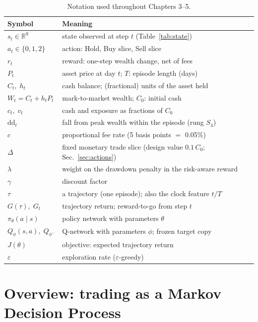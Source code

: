 \begin{table}[h]
\centering
\caption{Notation used throughout Chapters 3--5.}
\label{tab:notation}
\small
\begin{tabular}{ll}
\toprule
\textbf{Symbol} & \textbf{Meaning} \\
\midrule
$s_t \in \mathbb{R}^9$ & state observed at step $t$ (Table~\ref{tab:state}) \\
$a_t \in \{0,1,2\}$    & action: Hold, Buy slice, Sell slice \\
$r_t$                  & reward: one-step wealth change, net of fees \\
$P_t$                  & asset price at day $t$; \; $T$: episode length (days) \\
$C_t,\; h_t$           & cash balance; (fractional) units of the asset held \\
$W_t = C_t + h_t P_t$  & mark-to-market wealth; \; $C_0$: initial cash \\
$c_t,\; v_t$           & cash and exposure as fractions of $C_0$ \\
$\mathrm{dd}_t$        & fall from peak wealth within the episode (rung $S_4$) \\
$c$                    & proportional fee rate (5 basis points $=$ 0.05\%) \\
$\Delta$                & fixed monetary trade slice (design value $0.1\,C_0$; Sec.~\ref{sec:actions}) \\
$\lambda$              & weight on the drawdown penalty in the risk-aware reward \\
$\gamma$               & discount factor \\
$\tau$                 & a trajectory (one episode); also the clock feature $t/T$ \\
$G(\tau),\; G_t$       & trajectory return; reward-to-go from step $t$ \\
$\pi_\theta(a\mid s)$  & policy network with parameters $\theta$ \\
$Q_\phi(s,a),\;Q_{\phi^-}$ & Q-network with parameters $\phi$; frozen target copy \\
$J(\theta)$            & objective: expected trajectory return \\
$\varepsilon$          & exploration rate ($\varepsilon$-greedy) \\
\bottomrule
\end{tabular}
\end{table}

\section{Overview: trading as a Markov Decision Process}
\label{sec:mdp_overview}


